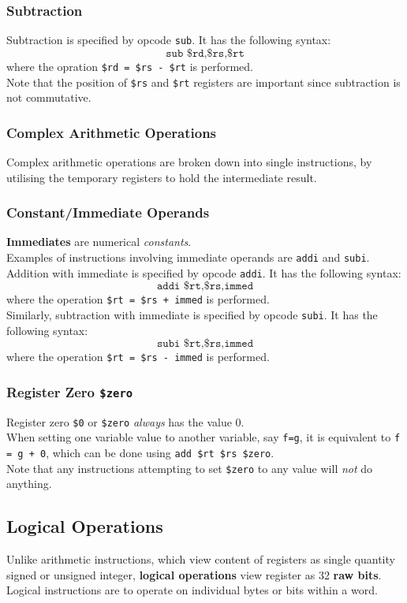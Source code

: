 \documentclass[12pt]{article}
\theoremstyle{definition}
\begin{document}
\subsubsection{Subtraction}
Subtraction is specified by opcode \texttt{sub}. It has the following syntax:
\[
\texttt{sub \$rd,\$rs,\$rt}
\]
where the opration \texttt{\$rd = \$rs - \$rt} is performed.\\
Note that the position of \texttt{\$rs} and \texttt{\$rt} registers are important since subtraction is not commutative.
\subsubsection{Complex Arithmetic Operations}
Complex arithmetic operations are broken down into single instructions, by utilising the temporary registers to hold the intermediate result.
\subsubsection{Constant/Immediate Operands}
\textbf{Immediates} are numerical \textit{constants}.\\Examples of instructions involving immediate operands are \texttt{addi} and \texttt{subi}.
Addition with immediate is specified by opcode \texttt{addi}. It has the following syntax:
\[
\texttt{addi \$rt,\$rs,immed}
\]
where the operation \texttt{\$rt = \$rs + immed} is performed.\\
Similarly, subtraction with immediate is specified by opcode \texttt{subi}. It has the following syntax:
\[
\texttt{subi \$rt,\$rs,immed}
\]
where the operation \texttt{\$rt = \$rs - immed} is performed.
\subsubsection{Register Zero {\texttt{\$zero}}}
Register zero \texttt{\$0} or \texttt{\$zero} \textit{always} has the value 0.\\When setting one variable value to another variable, say \texttt{f=g}, it is equivalent to \texttt{f = g + 0}, which can be done using \texttt{add \$rt \$rs \$zero}.\\
Note that any instructions attempting to set \texttt{\$zero} to any value will \textit{not} do anything.
\subsection{Logical Operations}
Unlike arithmetic instructions, which view content of registers as single quantity signed or unsigned integer, \textbf{logical operations} view register as 32 \textbf{raw bits}.\\Logical instructions are to operate on individual bytes or bits within a word.
\end{document}

